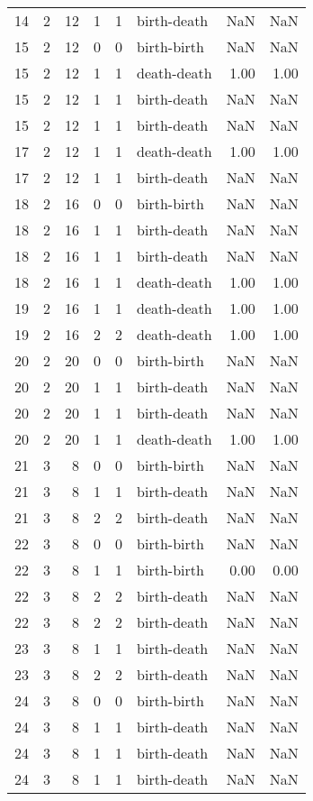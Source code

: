 \documentclass{article}
\begin{document}
\begin{center}
\begin{tabular}{rrrrrlrr}
14 & 2 & 12 & 1 & 1 & birth-death & NaN & NaN \\
15 & 2 & 12 & 0 & 0 & birth-birth & NaN & NaN \\
15 & 2 & 12 & 1 & 1 & death-death & 1.00 & 1.00 \\
15 & 2 & 12 & 1 & 1 & birth-death & NaN & NaN \\
15 & 2 & 12 & 1 & 1 & birth-death & NaN & NaN \\
17 & 2 & 12 & 1 & 1 & death-death & 1.00 & 1.00 \\
17 & 2 & 12 & 1 & 1 & birth-death & NaN & NaN \\
18 & 2 & 16 & 0 & 0 & birth-birth & NaN & NaN \\
18 & 2 & 16 & 1 & 1 & birth-death & NaN & NaN \\
18 & 2 & 16 & 1 & 1 & birth-death & NaN & NaN \\
18 & 2 & 16 & 1 & 1 & death-death & 1.00 & 1.00 \\
19 & 2 & 16 & 1 & 1 & death-death & 1.00 & 1.00 \\
19 & 2 & 16 & 2 & 2 & death-death & 1.00 & 1.00 \\
20 & 2 & 20 & 0 & 0 & birth-birth & NaN & NaN \\
20 & 2 & 20 & 1 & 1 & birth-death & NaN & NaN \\
20 & 2 & 20 & 1 & 1 & birth-death & NaN & NaN \\
20 & 2 & 20 & 1 & 1 & death-death & 1.00 & 1.00 \\
21 & 3 & 8 & 0 & 0 & birth-birth & NaN & NaN \\
21 & 3 & 8 & 1 & 1 & birth-death & NaN & NaN \\
21 & 3 & 8 & 2 & 2 & birth-death & NaN & NaN \\
22 & 3 & 8 & 0 & 0 & birth-birth & NaN & NaN \\
22 & 3 & 8 & 1 & 1 & birth-birth & 0.00 & 0.00 \\
22 & 3 & 8 & 2 & 2 & birth-death & NaN & NaN \\
22 & 3 & 8 & 2 & 2 & birth-death & NaN & NaN \\
23 & 3 & 8 & 1 & 1 & birth-death & NaN & NaN \\
23 & 3 & 8 & 2 & 2 & birth-death & NaN & NaN \\
24 & 3 & 8 & 0 & 0 & birth-birth & NaN & NaN \\
24 & 3 & 8 & 1 & 1 & birth-death & NaN & NaN \\
24 & 3 & 8 & 1 & 1 & birth-death & NaN & NaN \\
24 & 3 & 8 & 1 & 1 & birth-death & NaN & NaN \\

\end{tabular}
\end{center}
\end{document}
